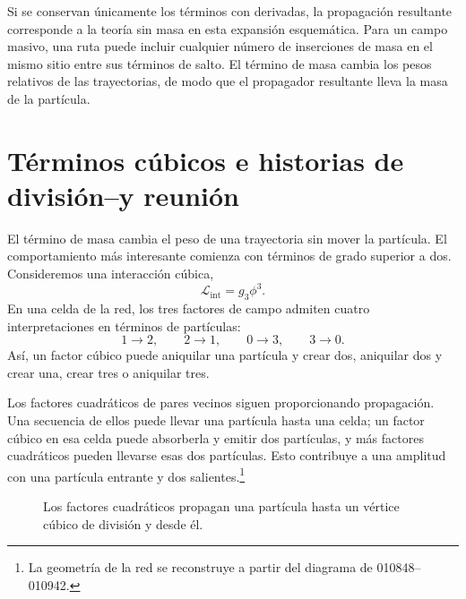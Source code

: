 Si se conservan únicamente los términos con derivadas, la propagación resultante corresponde a la teoría sin masa en esta expansión esquemática. Para un campo masivo, una ruta puede incluir cualquier número de inserciones de masa en el mismo sitio entre sus términos de salto. El término de masa cambia los pesos relativos de las trayectorias, de modo que el propagador resultante lleva la masa de la partícula.

\section{Términos cúbicos e historias de división--y reunión}

El término de masa cambia el peso de una trayectoria sin mover la partícula. El comportamiento más interesante comienza con términos de grado superior a dos. Consideremos una interacción cúbica,
\begin{equation}
\mathcal{L}_{\mathrm{int}}=g_3\phi^3.
\end{equation}
En una celda de la red, los tres factores de campo admiten cuatro interpretaciones en términos de partículas:
\begin{equation}
1\longrightarrow 2,
\qquad
2\longrightarrow 1,
\qquad
0\longrightarrow 3,
\qquad
3\longrightarrow 0.
\end{equation}
Así, un factor cúbico puede aniquilar una partícula y crear dos, aniquilar dos y crear una, crear tres o aniquilar tres.

Los factores cuadráticos de pares vecinos siguen proporcionando propagación. Una secuencia de ellos puede llevar una partícula hasta una celda; un factor cúbico en esa celda puede absorberla y emitir dos partículas, y más factores cuadráticos pueden llevarse esas dos partículas. Esto contribuye a una amplitud con una partícula entrante y dos salientes.\footnote{La geometría de la red se reconstruye a partir del diagrama de 010848--010942.}

\begin{figure}[htbp]\centering
{}\caption{Los factores cuadráticos propagan una partícula hasta un vértice cúbico de división y desde él.}\end{figure}

